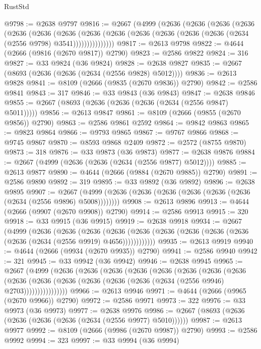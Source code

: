 \begin{lexlean}{RustStd}
\begin{coremodule}
@9798 := @2638 @9797
@9816 := @2667
    (@4999
      (@2636
        (@2636
          (@2636
            (@2636
              (@2636
                (@2636
                  (@2636
                    (@2636
                      (@2636 (@2636 (@2636 (@2636 (@2636 (@2634 (@2556 @9798) @3541)))))))))))))))
@9817 := @2613 @9798
@9822 := @4644 (@2666 (@9816 (@2670 @9817)) @2790)
@9823 := @2586 @9822
@9824 := 316
@9827 := @33 @9824 (@36 @9824)
@9828 := @2638 @9827
@9835 := @2667 (@8693 (@2636 (@2636 (@2634 (@2556 @9828) @5012))))
@9836 := @2613 @9828
@9841 := @8109 (@2666 (@9835 (@2670 @9836)) @2790)
@9842 := @2586 @9841
@9843 := 317
@9846 := @33 @9843 (@36 @9843)
@9847 := @2638 @9846
@9855 := @2667 (@8693 (@2636 (@2636 (@2636 (@2634 (@2556 @9847) @5011)))))
@9856 := @2613 @9847
@9861 := @8109 (@2666 (@9855 (@2670 @9856)) @2790)
@9863 := @2586 @9861 @2592
@9864 := @9842 @9863
@9865 := @9823 @9864
@9866 := @9793 @9865
@9867 := @9767 @9866
@9868 := @9745 @9867
@9870 := @8593 @9868 @2409
@9872 := @2572 (@8755 @9870)
@9873 := 318
@9876 := @33 @9873 (@36 @9873)
@9877 := @2638 @9876
@9884 := @2667 (@4999 (@2636 (@2636 (@2634 (@2556 @9877) @5012))))
@9885 := @2613 @9877
@9890 := @4644 (@2666 (@9884 (@2670 @9885)) @2790)
@9891 := @2586 @9890
@9892 := 319
@9895 := @33 @9892 (@36 @9892)
@9896 := @2638 @9895
@9907 := @2667 (@4999 (@2636 (@2636 (@2636 (@2636 (@2636 (@2636 (@2634 (@2556 @9896) @5008))))))))
@9908 := @2613 @9896
@9913 := @4644 (@2666 (@9907 (@2670 @9908)) @2790)
@9914 := @2586 @9913
@9915 := 320
@9918 := @33 @9915 (@36 @9915)
@9919 := @2638 @9918
@9934 := @2667
    (@4999
      (@2636
        (@2636
          (@2636
            (@2636 (@2636 (@2636 (@2636 (@2636 (@2636 (@2636 (@2634 (@2556 @9919) @4656))))))))))))
@9935 := @2613 @9919
@9940 := @4644 (@2666 (@9934 (@2670 @9935)) @2790)
@9941 := @2586 @9940
@9942 := 321
@9945 := @33 @9942 (@36 @9942)
@9946 := @2638 @9945
@9965 := @2667
    (@4999
      (@2636
        (@2636
          (@2636
            (@2636
              (@2636
                (@2636
                  (@2636
                    (@2636
                      (@2636
                        (@2636
                          (@2636 (@2636 (@2636 (@2636 (@2634 (@2556 @9946) @2703))))))))))))))))
@9966 := @2613 @9946
@9971 := @4644 (@2666 (@9965 (@2670 @9966)) @2790)
@9972 := @2586 @9971
@9973 := 322
@9976 := @33 @9973 (@36 @9973)
@9977 := @2638 @9976
@9986 := @2667 (@8693 (@2636 (@2636 (@2636 (@2636 (@2634 (@2556 @9977) @5010))))))
@9987 := @2613 @9977
@9992 := @8109 (@2666 (@9986 (@2670 @9987)) @2790)
@9993 := @2586 @9992
@9994 := 323
@9997 := @33 @9994 (@36 @9994)

\end{coremodule}
\end{lexlean}

